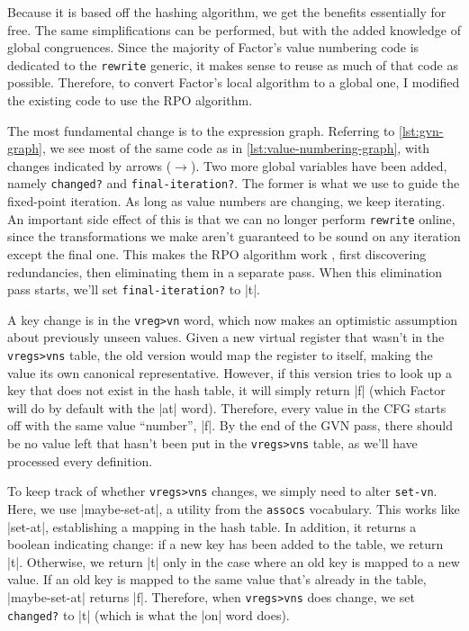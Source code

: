 Because it is based off the hashing algorithm, we get the benefits essentially
for free.  The same simplifications can be performed, but with the added
knowledge of global congruences.  Since the majority of Factor's value
numbering code is dedicated to the \Verb|rewrite| generic, it makes sense to
reuse as much of that code as possible.  Therefore, to convert Factor's local
algorithm to a global one, I modified the existing code to use the \gls{RPO}
algorithm.


The most fundamental change is to the expression graph.  Referring to
\cref{lst:gvn-graph}, we see most of the same code as in
\cref{lst:value-numbering-graph}, with changes indicated by arrows
($\longrightarrow$).  Two more global variables have been added, namely
\Verb|changed?| and \Verb|final-iteration?|.  The former is what we use to
guide the fixed-point iteration.  As long as value numbers are changing, we
keep iterating.  An important side effect of this is that we can no longer
perform \Verb|rewrite| online, since the transformations we make aren't
guaranteed to be sound on any iteration except the final one.  This makes the
\gls{RPO} algorithm work , first discovering redundancies, then
eliminating them in a separate pass.  When this elimination pass starts, we'll
set \Verb|final-iteration?| to \factor|t|.

A key change is in the \Verb|vreg>vn| word, which now makes an optimistic
assumption about previously unseen values.  Given a new virtual register that
wasn't in the \Verb|vregs>vns| table, the old version would map the register
to itself, making the value its own canonical representative.  However, if this
version tries to look up a key that does not exist in the hash table, it will
simply return \factor|f| (which Factor will do by default with the \factor|at|
word).  Therefore, every value in the \gls{CFG} starts off with the same value
``number'', \factor|f|.  By the end of the \gls{GVN} pass, there should be no
value left that hasn't been put in the \Verb|vregs>vns| table, as we'll have
processed every definition.

To keep track of whether \Verb|vregs>vns| changes, we simply need to alter
\Verb|set-vn|.  Here, we use \factor|maybe-set-at|, a utility from the
\Verb|assocs| vocabulary.  This works like \factor|set-at|, establishing a
mapping in the hash table.  In addition, it returns a boolean indicating
change: if a new key has been added to the table, we return \factor|t|.
Otherwise, we return \factor|t| only in the case where an old key is mapped to
a new value.  If an old key is mapped to the same value that's already in the
table, \factor|maybe-set-at| returns \factor|f|.  Therefore, when
\Verb|vregs>vns| does change, we set \Verb|changed?| to \factor|t| (which
is what the \factor|on| word does).

